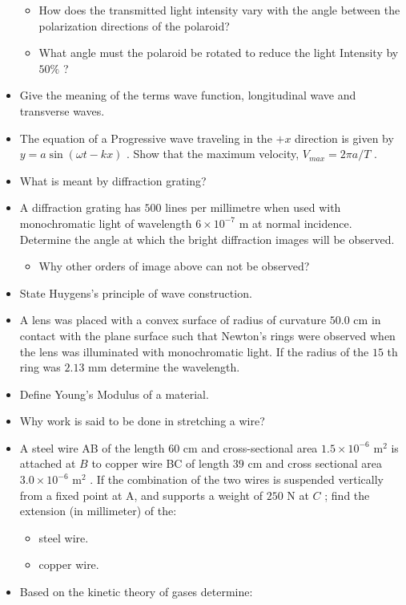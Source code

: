 \documentclass{article}
\begin{document}
\begin{itemize}
 \begin{itemize}
\item How does the transmitted light intensity vary with the angle between the polarization directions of the polaroid? 
\item What angle must the polaroid be rotated to reduce the light Intensity by $ 50\%$ ?
\end{itemize}
\item Give the meaning of the terms wave function, longitudinal wave and transverse waves.
\item The equation of a Progressive wave traveling in the $ +x$ direction is given by $ y= a \sin(\omega t-kx)$ .  Show that the maximum velocity, $ V_{max}=2\pi a /T$ . 
\item What is meant by diffraction grating?
\item A diffraction grating has $ 500$ lines per millimetre when used with monochromatic light of wavelength $ 6 \times 10^{-7}$ m at normal incidence. Determine the angle at which the bright diffraction images will be observed. 
 \begin{itemize}
\item Why other orders of image above can not be observed? 
\end{itemize}
\item State Huygens’s principle of wave construction.
\item A lens was placed with a convex surface of radius of curvature $ 50.0$ cm in contact with the plane surface such that Newton’s rings were observed when the lens was illuminated with monochromatic light. If the radius of the $ 15$ th ring was $ 2.13$ mm determine the wavelength. 
\item Define Young’s Modulus of a material. 
\item Why work is said to be done in stretching a wire? 
\item A steel wire AB of the length $ 60$ cm and cross-sectional area $ 1.5 \times 10^{-6}$ m$ ^{2}$ is attached at $ B$ to copper wire BC of length $ 39$ cm and cross sectional area $ 3.0 \times 10^{-6}$ m$ ^{2}$ . If the combination of the two wires is suspended vertically from a fixed point at A, and supports a weight of $ 250$ N at $ C$ ; find the extension (in millimeter) of the:
 \begin{itemize}
\item steel wire. 
\item copper wire. 
\end{itemize}
\item Based on the kinetic theory of gases determine:

\end{itemize}
\end{document}
